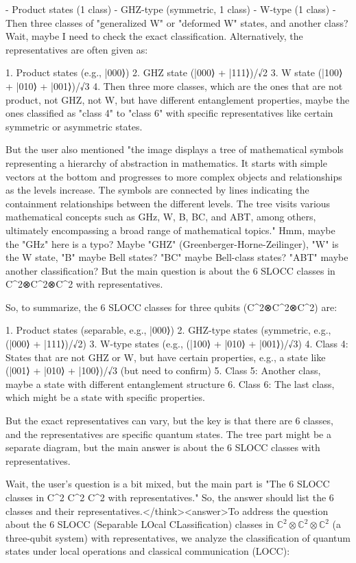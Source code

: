 - Product states (1 class)
- GHZ-type (symmetric, 1 class)
- W-type (1 class)
- Then three classes of "generalized W" or "deformed W" states, and another class? Wait, maybe I need to check the exact classification. Alternatively, the representatives are often given as:

1. Product states (e.g., |000⟩)
2. GHZ state (|000⟩ + |111⟩)/√2
3. W state (|100⟩ + |010⟩ + |001⟩)/√3
4. Then three more classes, which are the ones that are not product, not GHZ, not W, but have different entanglement properties, maybe the ones classified as "class 4" to "class 6" with specific representatives like certain symmetric or asymmetric states.

But the user also mentioned "the image displays a tree of mathematical symbols representing a hierarchy of abstraction in mathematics. It starts with simple vectors at the bottom and progresses to more complex objects and relationships as the levels increase. The symbols are connected by lines indicating the containment relationships between the different levels. The tree visits various mathematical concepts such as GHz, W, B, BC, and ABT, among others, ultimately encompassing a broad range of mathematical topics." Hmm, maybe the "GHz" here is a typo? Maybe "GHZ" (Greenberger-Horne-Zeilinger), "W" is the W state, "B" maybe Bell states? "BC" maybe Bell-class states? "ABT" maybe another classification? But the main question is about the 6 SLOCC classes in C^2⊗C^2⊗C^2 with representatives.

So, to summarize, the 6 SLOCC classes for three qubits (C^2⊗C^2⊗C^2) are:

1. Product states (separable, e.g., |000⟩)
2. GHZ-type states (symmetric, e.g., (|000⟩ + |111⟩)/√2)
3. W-type states (e.g., (|100⟩ + |010⟩ + |001⟩)/√3)
4. Class 4: States that are not GHZ or W, but have certain properties, e.g., a state like (|001⟩ + |010⟩ + |100⟩)/√3 (but need to confirm)
5. Class 5: Another class, maybe a state with different entanglement structure
6. Class 6: The last class, which might be a state with specific properties.

But the exact representatives can vary, but the key is that there are 6 classes, and the representatives are specific quantum states. The tree part might be a separate diagram, but the main answer is about the 6 SLOCC classes with representatives.

Wait, the user's question is a bit mixed, but the main part is "The 6 SLOCC classes in C^2 C^2 C^2 with representatives." So, the answer should list the 6 classes and their representatives.</think><answer>To address the question about the 6 SLOCC (Separable LOcal CLassification) classes in \( \mathbb{C}^2 \otimes \mathbb{C}^2 \otimes \mathbb{C}^2 \) (a three-qubit system) with representatives, we analyze the classification of quantum states under local operations and classical communication (LOCC):  


